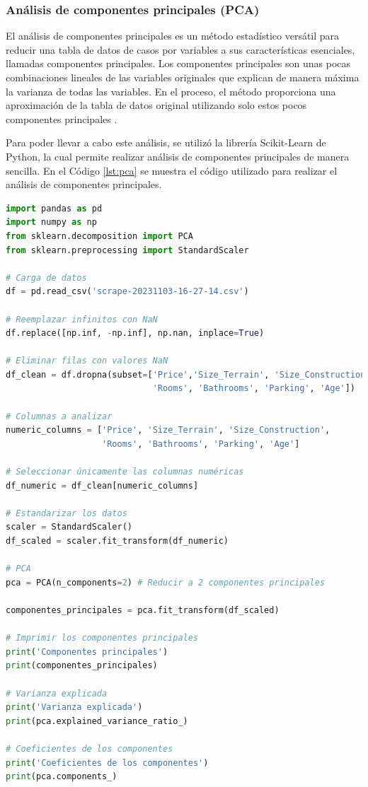 \subsubsection{Análisis de componentes principales (PCA)}

El análisis de componentes principales es un método estadístico versátil para
reducir una tabla de datos de casos por variables a sus características esenciales,
llamadas componentes principales. Los componentes principales son unas pocas
combinaciones lineales de las variables originales que explican de manera
máxima la varianza de todas las variables. En el proceso, el método proporciona
una aproximación de la tabla de datos original utilizando solo estos pocos
componentes principales \cite{greenacre2022principal}.

Para poder llevar a cabo este análisis, se utilizó la librería Scikit-Learn de
Python, la cual permite realizar análisis de componentes principales de manera
sencilla. En el Código \ref{lst:pca} se muestra el código utilizado para realizar
el análisis de componentes principales.

\begin{lstlisting}[language=Python, label=lst:pca, caption=Análisis de componentes principales (PCA).]
import pandas as pd
import numpy as np
from sklearn.decomposition import PCA
from sklearn.preprocessing import StandardScaler

# Carga de datos
df = pd.read_csv('scrape-20231103-16-27-14.csv')

# Reemplazar infinitos con NaN
df.replace([np.inf, -np.inf], np.nan, inplace=True)

# Eliminar filas con valores NaN
df_clean = df.dropna(subset=['Price','Size_Terrain', 'Size_Construction',
                             'Rooms', 'Bathrooms', 'Parking', 'Age'])

# Columnas a analizar
numeric_columns = ['Price', 'Size_Terrain', 'Size_Construction',
                   'Rooms', 'Bathrooms', 'Parking', 'Age']

# Seleccionar únicamente las columnas numéricas
df_numeric = df_clean[numeric_columns]

# Estandarizar los datos
scaler = StandardScaler()
df_scaled = scaler.fit_transform(df_numeric)

# PCA
pca = PCA(n_components=2) # Reducir a 2 componentes principales

componentes_principales = pca.fit_transform(df_scaled)

# Imprimir los componentes principales
print('Componentes principales')
print(componentes_principales)

# Varianza explicada
print('Varianza explicada')
print(pca.explained_variance_ratio_)

# Coeficientes de los componentes
print('Coeficientes de los componentes')
print(pca.components_)


\end{lstlisting}

